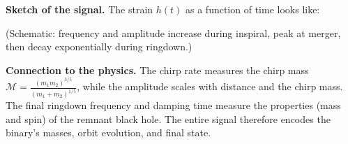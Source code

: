 \documentclass[12pt]{article}
\begin{document}
\textbf{Sketch of the signal.} The strain $h(t)$ as a function of time looks like:
\begin{center}
\end{center}
(Schematic: frequency and amplitude increase during inspiral, peak at merger, then decay exponentially during ringdown.)

\textbf{Connection to the physics.} The chirp rate measures the chirp mass $\mathcal{M}=\frac{(m_1m_2)^{3/5}}{(m_1+m_2)^{1/5}}$, while the amplitude scales with distance and the chirp mass. The final ringdown frequency and damping time measure the properties (mass and spin) of the remnant black hole. The entire signal therefore encodes the binary's masses, orbit evolution, and final state.
\end{document}
